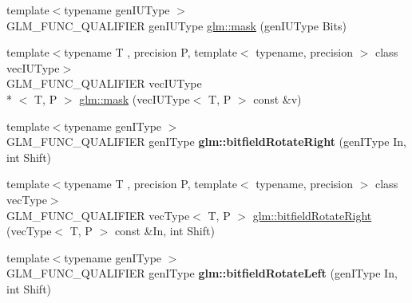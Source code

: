 \begin{DoxyCompactItemize}
\item 
{\footnotesize template$<$typename gen\-I\-U\-Type $>$ }\\G\-L\-M\-\_\-\-F\-U\-N\-C\-\_\-\-Q\-U\-A\-L\-I\-F\-I\-E\-R gen\-I\-U\-Type \hyperlink{group__gtc__bitfield_gad7eba518a0b71662114571ee76939f8a}{glm\-::mask} (gen\-I\-U\-Type Bits)
\item 
{\footnotesize template$<$typename T , precision P, template$<$ typename, precision $>$ class vec\-I\-U\-Type$>$ }\\G\-L\-M\-\_\-\-F\-U\-N\-C\-\_\-\-Q\-U\-A\-L\-I\-F\-I\-E\-R vec\-I\-U\-Type\\*
$<$ T, P $>$ \hyperlink{group__gtc__bitfield_ga073dbd8642f550b51da3572541431c1c}{glm\-::mask} (vec\-I\-U\-Type$<$ T, P $>$ const \&v)
\item 
\hypertarget{namespaceglm_a29f065281c52cf3ca7695e71504687fc}{{\footnotesize template$<$typename gen\-I\-Type $>$ }\\G\-L\-M\-\_\-\-F\-U\-N\-C\-\_\-\-Q\-U\-A\-L\-I\-F\-I\-E\-R gen\-I\-Type {\bfseries glm\-::bitfield\-Rotate\-Right} (gen\-I\-Type In, int Shift)}\label{namespaceglm_a29f065281c52cf3ca7695e71504687fc}

\item 
{\footnotesize template$<$typename T , precision P, template$<$ typename, precision $>$ class vec\-Type$>$ }\\G\-L\-M\-\_\-\-F\-U\-N\-C\-\_\-\-Q\-U\-A\-L\-I\-F\-I\-E\-R vec\-Type$<$ T, P $>$ \hyperlink{group__gtc__bitfield_ga96b56fd2adad1eeaee9e10dfe83904ba}{glm\-::bitfield\-Rotate\-Right} (vec\-Type$<$ T, P $>$ const \&In, int Shift)
\item 
\hypertarget{namespaceglm_ae088d9983f8cb8fcf0aacae4ae51462a}{{\footnotesize template$<$typename gen\-I\-Type $>$ }\\G\-L\-M\-\_\-\-F\-U\-N\-C\-\_\-\-Q\-U\-A\-L\-I\-F\-I\-E\-R gen\-I\-Type {\bfseries glm\-::bitfield\-Rotate\-Left} (gen\-I\-Type In, int Shift)}\label{namespaceglm_ae088d9983f8cb8fcf0aacae4ae51462a}


\end{DoxyCompactItemize}
